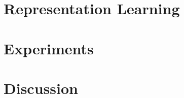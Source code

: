 \section{Representation Learning}
\section{Experiments}
\section{Discussion}


\noindent 

%
%
%
%

